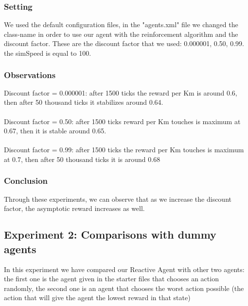 \documentclass[11pt]{article}
\begin{document}
\subsubsection{Setting}
We used the default configuration files, in the "agents.xml" file we changed the class-name in order to use our agent with the reinforcement algorithm and the discount factor. These are the discount factor that we used: { 0.000001, 0.50, 0.99}. the simSpeed is equal to 100.

\subsubsection{Observations}

Discount factor = 0.000001: after 1500 ticks the reward per Km is around 0.6, then after 50 thousand ticks it stabilizes around 0.64.
\\
\\
Discount factor = 0.50: after 1500 ticks reward per Km touches is maximum at 0.67, then it is stable around 0.65.
\\
\\
Discount factor = 0.99: after 1500 ticks the reward per Km touches is maximum at 0.7, then after 50 thousand ticks it is around 0.68

\subsubsection{Conclusion}
Through these experiments, we can observe that as we increase the discount factor, the asymptotic reward increases as well.
\subsection{Experiment 2: Comparisons with dummy agents}
In this experiment we have compared our Reactive Agent with other two agents: the first one is the agent given in the starter files that chooses an action randomly, the second one is an agent that chooses the worst action possible (the action that will give the agent the lowest reward in that state)
\end{document}
